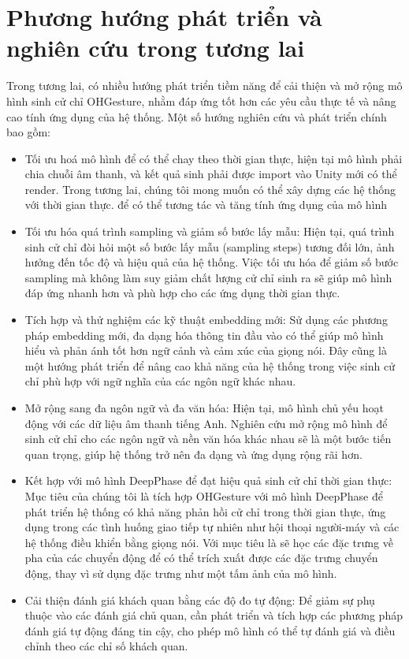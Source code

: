 \section{Phương hướng phát triển và nghiên cứu trong tương lai}


Trong tương lai, có nhiều hướng phát triển tiềm năng để cải thiện và mở rộng mô hình sinh cử chỉ OHGesture, nhằm đáp ứng tốt hơn các yêu cầu thực tế và nâng cao tính ứng dụng của hệ thống. Một số hướng nghiên cứu và phát triển chính bao gồm:

\begin{itemize}
	\item Tối ưu hoá mô hình để có thể chay theo thời gian thực, hiện tại mô hình phải chia chuỗi âm thanh, và kết quả sinh phải được  import vào Unity mới có thể render. Trong tương lai, chúng tôi mong muốn có thể xây dựng các hệ thống với thời gian thực. để có thể tương tác và tăng tính ứng dụng của mô hình
	
	\item Tối ưu hóa quá trình sampling và giảm số bước lấy mẫu: Hiện tại, quá trình sinh cử chỉ đòi hỏi một số bước lấy mẫu (sampling steps) tương đối lớn, ảnh hưởng đến tốc độ và hiệu quả của hệ thống. Việc tối ưu hóa để giảm số bước sampling mà không làm suy giảm chất lượng cử chỉ sinh ra sẽ giúp mô hình đáp ứng nhanh hơn và phù hợp cho các ứng dụng thời gian thực.
	
	\item Tích hợp và thử nghiệm các kỹ thuật embedding mới: Sử dụng các phương pháp embedding mới, đa dạng hóa thông tin đầu vào có thể giúp mô hình hiểu và phản ánh tốt hơn ngữ cảnh và cảm xúc của giọng nói. Đây cũng là một hướng phát triển để nâng cao khả năng của hệ thống trong việc sinh cử chỉ phù hợp với ngữ nghĩa của các ngôn ngữ khác nhau.
	
	\item Mở rộng sang đa ngôn ngữ và đa văn hóa: Hiện tại, mô hình chủ yếu hoạt động với các dữ liệu âm thanh tiếng Anh. Nghiên cứu mở rộng mô hình để sinh cử chỉ cho các ngôn ngữ và nền văn hóa khác nhau sẽ là một bước tiến quan trọng, giúp hệ thống trở nên đa dạng và ứng dụng rộng rãi hơn.
	
	\item Kết hợp với mô hình DeepPhase \cite{starke2022deepphase} để đạt hiệu quả sinh cử chỉ thời gian thực: Mục tiêu của chúng tôi là tích hợp OHGesture với mô hình DeepPhase để phát triển hệ thống có khả năng phản hồi cử chỉ trong thời gian thực, ứng dụng trong các tình huống giao tiếp tự nhiên như hội thoại người-máy và các hệ thống điều khiển bằng giọng nói. Với mục tiêu là sẽ học các đặc trưng về pha của các chuyển động để có thể trích xuất được các đặc trưng chuyển động, thay vì sử dụng đặc trưng như một tấm ảnh của mô hình.
	
	
	\item Cải thiện đánh giá khách quan bằng các độ đo tự động: Để giảm sự phụ thuộc vào các đánh giá chủ quan, cần phát triển và tích hợp các phương pháp đánh giá tự động đáng tin cậy, cho phép mô hình có thể tự đánh giá và điều chỉnh theo các chỉ số khách quan.
	\end{itemize}
